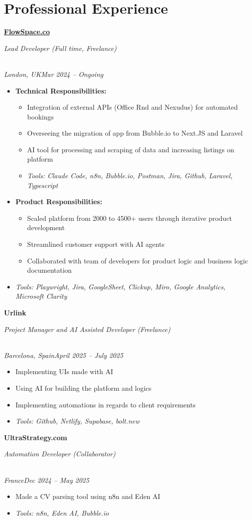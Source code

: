 \documentclass[a4paper,10pt]{article}
\newcommand{\role}[4]{\vspace{3pt}\noindent\hspace{0.6em}\parbox[t]{0.38\textwidth}{\raggedright\textbf{#1}}\hfill\parbox[t]{0.58\textwidth}{\raggedleft\textit{#2}}\\{\textit{#3}\hfill\textit{#4}}\vspace{1pt}}
\begin{document}
\section{Professional Experience}
\role{\href{https://flowspace.co}{FlowSpace.co}}{Lead Developer (Full time, Freelance)}{London, UK}{Mar 2024 -- Ongoing}
\begin{itemize}
\item \textbf{Technical Responsibilities:}
\begin{itemize}[label=--]
\item Integration of external APIs (Office Rnd and Nexudus) for automated bookings
\item Overseeing the migration of app from Bubble.io to Next.JS and Laravel
\item AI tool for processing and scraping of data and increasing listings on platform
\item \textit{Tools: Claude Code, n8n, Bubble.io, Postman, Jira, Github, Laravel, Typescript}
\end{itemize}
\item \textbf{Product Responsibilities:}
\begin{itemize}[label=--]
\item Scaled platform from 2000 to 4500+ users through iterative product development
\item Streamlined customer support with AI agents
\item Collaborated with team of developers for product logic and business logic documentation
\end{itemize}
\item \textit{Tools: Playwright, Jira, GoogleSheet, Clickup, Miro, Google Analytics, Microsoft Clarity}
\end{itemize}

\role{Urlink}{Project Manager and AI Assisted Developer (Freelance)}{Barcelona, Spain}{April 2025 -- July 2025}
\begin{itemize}
\item Implementing UIs made with AI
\item Using AI for building the platform and logics
\item Implementing automations in regards to client requirements
\item \textit{Tools: Github, Netlify, Supabase, bolt.new}
\end{itemize}

\role{UltraStrategy.com}{Automation Developer (Collaborator)}{France}{Dec 2024 -- May 2025}
\begin{itemize}
\item Made a CV parsing tool using n8n and Eden AI
\item \textit{Tools: n8n, Eden AI, Bubble.io}
\end{itemize}
\end{document}
